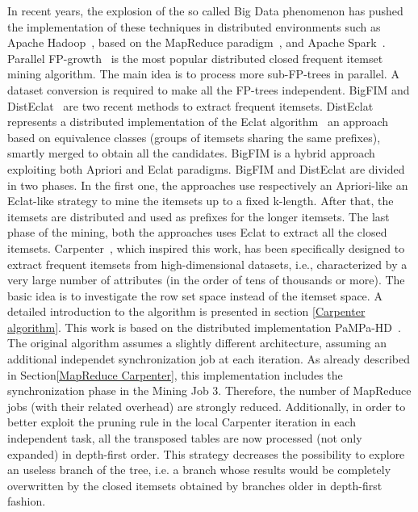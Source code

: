 In recent years, the explosion of the so called Big Data phenomenon 
has pushed the implementation of these techniques in distributed environments 
such as Apache Hadoop~\cite{HDFS}, 
based on the MapReduce paradigm~\cite{ArticoloMapReduceGoogle}, 
and Apache Spark~\cite{Zaharia_spark}. 
Parallel FP-growth~\cite{pfpgrowth} is the most popular 
distributed closed frequent itemset mining algorithm. 
The main idea is to process more sub-FP-trees in parallel. 
A dataset conversion is required to make all the FP-trees independent. 
BigFIM and DistEclat~\cite{bigfim} are two recent methods to extract frequent itemsets. 
DistEclat represents a distributed implementation of the Eclat algorithm~\cite{Zaki97newalgorithms} 
an approach based on equivalence classes (groups of itemsets sharing the same prefixes), 
smartly merged to obtain all the candidates. 
BigFIM is a hybrid approach exploiting both Apriori and Eclat paradigms.
BigFIM and DistEclat are divided in two phases. In the first one, the approaches use respectively an Apriori-like an Eclat-like strategy to mine the itemsets up to a fixed k-length. After that, the itemsets are distributed and used as prefixes for the longer itemsets. The last phase of the mining, both the approaches uses Eclat to extract all the closed itemsets.
Carpenter~\cite{Zaki_Carpenter}, which inspired this work, 
has been specifically designed to extract frequent itemsets 
from high-dimensional datasets, i.e., characterized by a very large number of attributes (in the order of tens of thousands or more). 
The basic idea is to investigate the row set space instead of the itemset space. 
A detailed introduction to the algorithm is presented in section \ref{Carpenter algorithm}.
This work is based on the distributed implementation PaMPa-HD~\cite{pampa_v1}. The original algorithm assumes a slightly different architecture, assuming an additional independet synchronization job at each iteration. As already described in Section\ref{MapReduce Carpenter}, this implementation includes the synchronization phase in the Mining Job 3. Therefore, the number of MapReduce jobs (with their related overhead) are strongly reduced.
Additionally, in order to better exploit the pruning rule in the local Carpenter iteration in each independent task, all the transposed tables are now processed (not only expanded) in depth-first order. This strategy decreases the possibility to explore an useless branch of the tree, i.e. a branch whose results would be completely overwritten by the closed itemsets obtained by branches older in depth-first fashion. 


